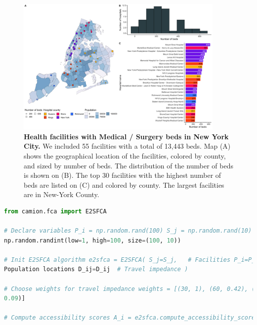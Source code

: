 \begin{figure}[H]
    \includegraphics[width=0.9\textwidth]{images/camion-ny/fig1.png}
    \centering
    \caption{ \textbf{Health facilities with Medical / Surgery beds in New York
            City.} We included 55 facilities with a total of 13,443 beds. Map (A)
        shows the geographical location of the facilities, colored by county,
        and sized by number of beds. The distribution of the number of beds is
        shown on (B). The top 30 facilities with the highest number of beds are
        listed on (C) and colored by county. The largest facilities are in
        New-York County. }
    \label{fig:camion-ny-beds}
\end{figure}

\begin{minipage}{\textwidth}
    \begin{lstlisting}[language=Python, caption=Compute accessibility score with \ac{e2sfca}]
from camion.fca import E2SFCA

# Declare variables P_i = np.random.rand(100) S_j = np.random.rand(10) D_ij =
np.random.randint(low=1, high=100, size=(100, 10))

# Init E2SFCA algorithm e2sfca = E2SFCA( S_j=S_j,   # Facilities P_i=P_i,   #
Population locations D_ij=D_ij  # Travel impedance )

# Choose weights for travel impedance weights = [(30, 1), (60, 0.42), (90,
0.09)]

# Compute accessibility scores A_i = e2sfca.compute_accessibility_score(weights)
\end{lstlisting}
\end{minipage}

